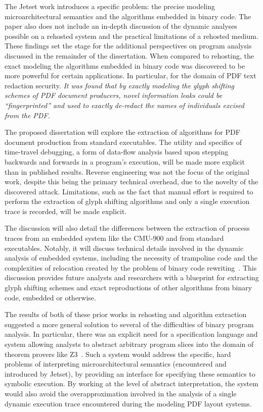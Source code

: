 The Jetset work introduces a specific problem: the precise modeling microarchitectural semantics and the algorithms embedded in binary code.
The paper also does not include an in-depth discussion of the dynamic analyses possible on a rehosted system and the practical limitations of a rehosted medium.
These findings set the stage for the additional perspectives on program analysis discussed in the remainder of the dissertation.
When compared to rehosting, the exact modeling the algorithms embedded in binary code was discovered to be more powerful for certain applications.
In particular, for the domain of PDF text redaction security.
\emph{It was found that by exactly modeling the glyph shifting schemes of PDF document producers, novel information leaks could be ``fingerprinted'' and used to exactly de-redact the names of individuals excised from the PDF.}

The proposed dissertation will explore the extraction of algorithms for PDF document production from standard executables.
The utility and specifics of time-travel debugging, a form of data-flow analysis based upon stepping backwards and forwards in a program's execution, will be made more explicit than in published results.
Reverse engineering was not the focus of the original work, despite this being the primary technical overhead, due to the novelty of the discovered attack.
Limitations, such as the fact that manual effort is required to perform the extraction of glyph shifting algorithms and only a single execution trace is recorded, will be made explicit.

The discussion will also detail the differences between the extraction of process traces from an embedded system like the CMU-900 and from standard executables.
Notably, it will discuss technical details involved in the dynamic analysis of embedded systems, including the necessity of trampoline code and the complexities of relocation created by the problem of binary code rewriting~\cite{wenzl2019hack}.
This discussion provides future analysts and researchers with a blueprint for extracting glyph shifting schemes and exact reproductions of other algorithms from binary code, embedded or otherwise.

The results of both of these prior works in rehosting and algorithm extraction suggested a more general solution to several of the difficulties of binary program analysis.
In particular, there was an explicit need for a specification language and system allowing analysts to abstract arbitrary program slices into the domain of theorem provers like Z3~\cite{de2008z3}.
Such a system would address the specific, hard problems of interpreting microarchitectural semantics (encountered and introduced by Jetset), by providing an interface for specifying these semantics to symbolic execution. 
By working at the level of abstract interpretation, the system would also avoid the overapproximation involved in the analysis of a single dynamic execution trace encountered during the modeling PDF layout systems.

